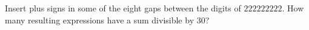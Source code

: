 Insert plus signs in some of the eight gaps between the digits of $222222222$. How many resulting expressions have a sum divisible by 30?
